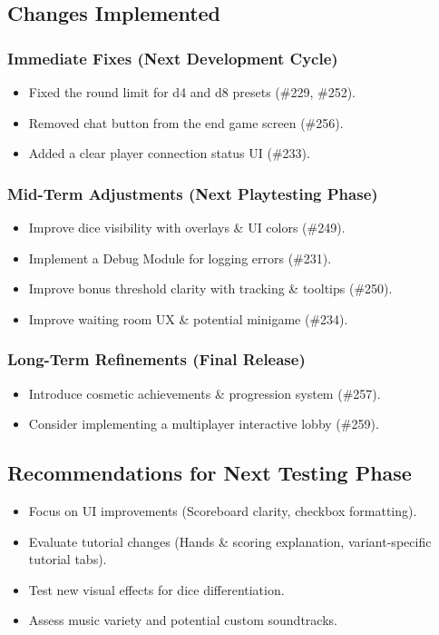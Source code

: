 \documentclass{article}
\begin{document}
\subsection{Changes Implemented}

\subsubsection{Immediate Fixes (Next Development Cycle)}
\begin{itemize}
    \item Fixed the round limit for d4 and d8 presets (\#229, \#252).
    \item Removed chat button from the end game screen (\#256).
    \item Added a clear player connection status UI (\#233).
\end{itemize}

\subsubsection{Mid-Term Adjustments (Next Playtesting Phase)}
\begin{itemize}
    \item Improve dice visibility with overlays \& UI colors (\#249).
    \item Implement a Debug Module for logging errors (\#231).
    \item Improve bonus threshold clarity with tracking \& tooltips (\#250).
    \item Improve waiting room UX \& potential minigame (\#234).
\end{itemize}

\subsubsection{Long-Term Refinements (Final Release)}
\begin{itemize}
    \item Introduce cosmetic achievements \& progression system (\#257).
    \item Consider implementing a multiplayer interactive lobby (\#259).
\end{itemize}

\subsection{Recommendations for Next Testing Phase}
\begin{itemize}
    \item Focus on UI improvements (Scoreboard clarity, checkbox formatting).
    \item Evaluate tutorial changes (Hands \& scoring explanation, variant-specific tutorial tabs).
    \item Test new visual effects for dice differentiation.
    \item Assess music variety and potential custom soundtracks.
\end{itemize}
\end{document}
